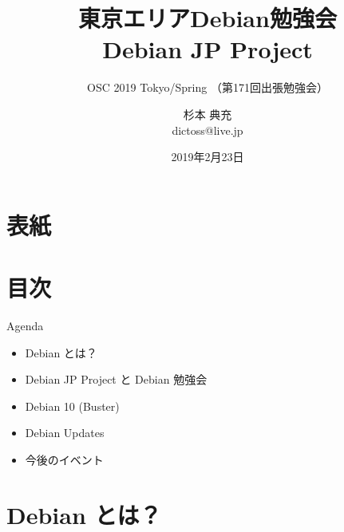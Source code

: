 \title{東京エリアDebian勉強会\\Debian JP Project}
\subtitle{OSC 2019 Tokyo/Spring （第171回出張勉強会）}
\author{杉本 典充\\ dictoss@live.jp}
\date{2019年2月23日}



\section{表紙}

\begin{frame}
\titlepage{}
\end{frame}

\section{目次}

\begin{frame}{Agenda}
  \begin{itemize}
  \item Debian とは？
  \item Debian JP Project と Debian 勉強会
  \item Debian 10 (Buster)
  \item Debian Updates
  \item 今後のイベント
  \end{itemize}
\end{frame}


\section{Debian とは？}


